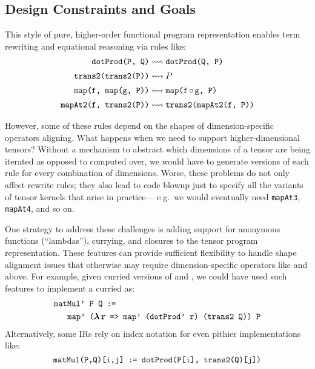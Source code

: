 \subsection{\g Design Constraints and Goals}

This style of pure, higher-order functional
  program representation enables
  term rewriting and equational reasoning
  via rules like:
\begin{align*}
  \mcd{dotProd(P, Q)}
    & \leftrightsquigarrow
      \mcd{dotProd(Q, P)} \\[2pt]
  \mcd{trans2(trans2(P))}
    & \leftrightsquigarrow
      P \\[2pt]
  \mcd{map(f, map(g, P))}
    & \leftrightsquigarrow
      \mcd{map(f$\,\circ\,$g, P)} \\[2pt]
  \mcd{mapAt2(f, trans2(P))}
    & \leftrightsquigarrow
      \mcd{trans2(mapAt2(f, P))} %
\end{align*}


However, some of these rules depend on the
  shapes of dimension-specific operators aligning.
What happens when we need to support
  higher-dimensional tensors?
Without a mechanism to abstract
  which dimensions of a tensor
  are being iterated as opposed to computed over,
  we would have to generate versions of
  each rule for every combination of dimensions.
Worse, these problems
  do not only affect rewrite rules;
  they also lead to code blowup just to
  specify all the variants of tensor kernels
  that arise in practice---%
  e.g.~we would eventually need
  \texttt{mapAt3}, \texttt{mapAt4},
  and so on.

One strategy to address these challenges is
  adding support for anonymous functions (``lambdas''),
  currying, and closures to the 
  tensor program representation.
These features can provide sufficient
  flexibility to handle shape alignment
  issues that otherwise may require
  dimension-specific operators like
   and  above.
For example, given curried versions
  of  and ,
  we could have used such features
  to implement a curried  as:
\begin{align*}
  & \mathrm{\texttt{matMul' P Q :=}} \\
  & \;\; \mathrm{\texttt{ \
      map' ($\boldsymbol\lambda\,$r =>\
        map' (dotProd' r) (trans2 Q)) P}}
\end{align*}
Alternatively, some IRs rely on index notation
  for even pithier implementations like:
$$
  \mathrm{\texttt{matMul(P,Q)[i,j] := dotProd(P[i], trans2(Q)[j])}}
$$


